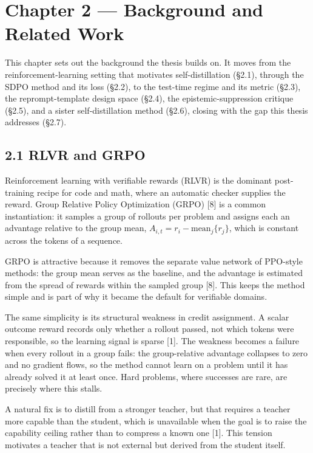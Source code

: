 \chapter{Chapter 2 --- Background and Related Work}\label{chapter-2-background-and-related-work}

This chapter sets out the background the thesis builds on. It moves from the reinforcement-learning setting that motivates self-distillation (§2.1), through the SDPO method and its loss (§2.2), to the test-time regime and its metric (§2.3), the reprompt-template design space (§2.4), the epistemic-suppression critique (§2.5), and a sister self-distillation method (§2.6), closing with the gap this thesis addresses (§2.7).

\section{2.1 RLVR and GRPO}\label{rlvr-and-grpo}

Reinforcement learning with verifiable rewards (RLVR) is the dominant post-training recipe for code and math, where an automatic checker supplies the reward. Group Relative Policy Optimization (GRPO) {[}8{]} is a common instantiation: it samples a group of rollouts per problem and assigns each an advantage relative to the group mean, \(A_{i,t} = r_i - \text{mean}_j\{r_j\}\), which is constant across the tokens of a sequence.

GRPO is attractive because it removes the separate value network of PPO-style methods: the group mean serves as the baseline, and the advantage is estimated from the spread of rewards within the sampled group {[}8{]}. This keeps the method simple and is part of why it became the default for verifiable domains.

The same simplicity is its structural weakness in credit assignment. A scalar outcome reward records only whether a rollout passed, not which tokens were responsible, so the learning signal is sparse {[}1{]}. The weakness becomes a failure when every rollout in a group fails: the group-relative advantage collapses to zero and no gradient flows, so the method cannot learn on a problem until it has already solved it at least once. Hard problems, where successes are rare, are precisely where this stalls.

A natural fix is to distill from a stronger teacher, but that requires a teacher more capable than the student, which is unavailable when the goal is to raise the capability ceiling rather than to compress a known one {[}1{]}. This tension motivates a teacher that is not external but derived from the student itself.

